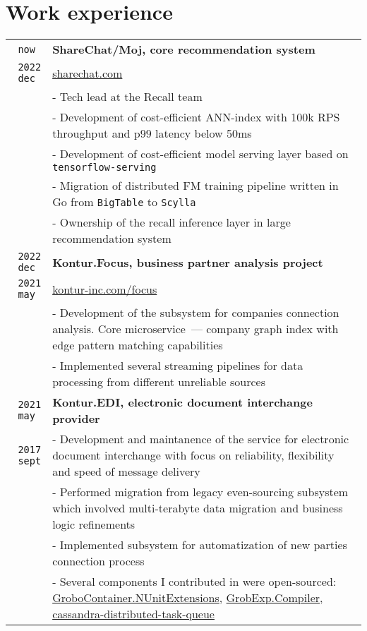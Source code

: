 \documentclass[10pt,a4paper]{article}
\begin{document}
\section{Work experience}
\vspace{1mm}
\begin{tabular}{r p{14cm}}
	\texttt{now{ }} & \textbf{ShareChat/Moj, core recommendation system}\\
	\texttt{2022 dec{ }} & \href{https://sharechat.com/}{sharechat.com}\\
	& \small{- Tech lead at the Recall team}\\
	& \small{- Development of cost-efficient ANN-index with 100k RPS throughput and p99 latency below 50ms}\\
	& \small{- Development of cost-efficient model serving layer based on \texttt{tensorflow-serving}}\\
	& \small{- Migration of distributed FM training pipeline written in Go from \texttt{BigTable} to \texttt{Scylla}}\\
	& \small{- Ownership of the recall inference layer in large recommendation system}\\

	\texttt{2022 dec{ }} & \textbf{Kontur.Focus, business partner analysis project}\\
	\texttt{2021 may{ }} & \href{https://kontur-inc.com/focus}{kontur-inc.com/focus}\\
	& \small{- Development of the subsystem for companies connection analysis. Core microservice~--- company graph index with edge pattern matching capabilities}\\
	& \small{- Implemented several streaming pipelines for data processing from different unreliable sources}\\

    \texttt{2021 may{ }} & \textbf{Kontur.EDI, electronic document interchange provider} \\
    \texttt{2017 sept} & \small{- Development and maintanence of the service for electronic document interchange with focus on reliability, flexibility and speed of message delivery}\\
    & \small{- Performed migration from legacy even-sourcing subsystem which involved multi-terabyte data migration and business logic refinements}\\
    & \small{- Implemented subsystem for automatization of new parties connection process}\\
    & \small{- Several components I contributed in were open-sourced: \href{https://github.com/skbkontur/GroboContainer.NUnitExtensions}{GroboContainer.NUnitExtensions}, \href{https://github.com/skbkontur/GrobExp.Compiler}{GrobExp.Compiler}, \href{https://github.com/skbkontur/cassandra-distributed-task-queue}{cassandra-distributed-task-queue}}\\
\end{tabular}
\end{document}
